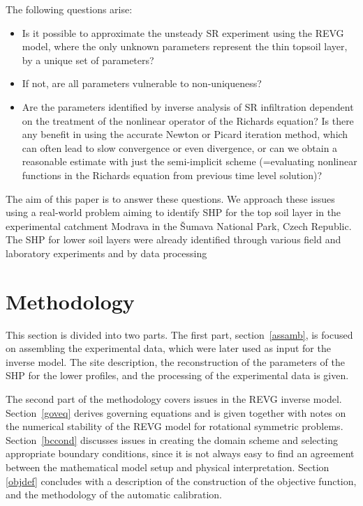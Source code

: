 \documentclass[review]{elsarticle}
\begin{document}
The following questions arise: 
\begin{itemize}
	\item Is it possible to approximate the unsteady SR experiment using the REVG model, where the only unknown parameters represent the thin topsoil layer, by a unique set of parameters? \
	\item If not, are all parameters vulnerable to non-uniqueness?
	\item Are the parameters identified by inverse analysis of SR infiltration dependent on the treatment of the nonlinear operator of the Richards equation? Is there any benefit in using the accurate Newton or Picard iteration method, which can often lead to slow convergence or even divergence, or can we obtain a reasonable estimate with just the semi-implicit scheme (=evaluating nonlinear functions in the Richards equation from previous time level solution)?
\end{itemize}



The aim of this paper is to answer these questions. We approach these issues using a real-world problem aiming to identify SHP for the top soil layer in the experimental catchment Modrava in the \v{S}umava National Park, Czech Republic. The SHP for lower soil layers were already identified through various field and laboratory experiments and by data processing %









\section{Methodology}%
\label{metodo}


This section is divided into two parts. The first part, section~\ref{assamb}, is focused on assembling the experimental data, which were later used as input for the inverse model. The site description, the reconstruction of the parameters of the SHP for the lower profiles, and the processing of the experimental data is given.   

The second part of the methodology covers issues in the REVG inverse model. Section~\ref{goveq} derives governing equations and is given together with notes on the numerical stability of the REVG model for rotational symmetric problems.
Section~\ref{bccond} discusses issues in creating the domain scheme and selecting appropriate boundary conditions, since it is not always easy to find an agreement between the mathematical model setup and  physical interpretation. Section \ref{objdef} concludes with a description of the construction of the objective function, and the methodology of the automatic calibration. 
\end{document}
